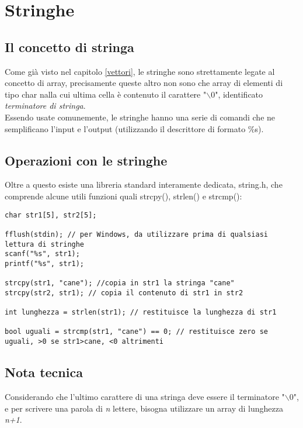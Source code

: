 \chapter{Stringhe}

\section{Il concetto di stringa}
Come già visto nel capitolo \ref{vettori}, le stringhe sono strettamente legate al concetto di array, precisamente queste altro non sono che array di elementi di tipo char nalla cui ultima cella è contenuto il carattere "$\backslash0$", identificato \textit{terminatore di stringa}.\\
Essendo usate comunemente, le stringhe hanno una serie di comandi che ne semplificano l'input e l'output (utilizzando il descrittore di formato \colorbox{light-gray}{\%s}).

\section{Operazioni con le stringhe}
Oltre a questo esiste una libreria standard interamente dedicata, \colorbox{light-gray}{string.h}, che comprende alcune utili funzioni quali \colorbox{light-gray}{strcpy()}, \colorbox{light-gray}{strlen()} e \colorbox{light-gray}{strcmp()}:
\begin{lstlisting}[title={Alcune operazione con le stringhe}]
char str1[5], str2[5];

fflush(stdin); // per Windows, da utilizzare prima di qualsiasi lettura di stringhe
scanf("%s", str1);
printf("%s", str1);

strcpy(str1, "cane"); //copia in str1 la stringa "cane"
strcpy(str2, str1); // copia il contenuto di str1 in str2

int lunghezza = strlen(str1); // restituisce la lunghezza di str1

bool uguali = strcmp(str1, "cane") == 0; // restituisce zero se uguali, >0 se str1>cane, <0 altrimenti
\end{lstlisting}
\section{Nota tecnica}
Considerando che l'ultimo carattere di una stringa deve essere il terminatore "$\backslash0$", e per scrivere una parola di \textit{n} lettere, bisogna utilizzare un array di lunghezza \textit{n+1}.